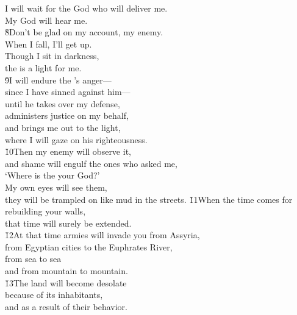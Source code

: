 \begin{poetry}
\poemll    I will wait for the God who will deliver me. \\
\poemlll       My God will hear me. \\
\poeml \v{8}Don't be glad on my account, my enemy. \\
\poemll    When I fall, I'll get up. \\
\poeml Though I sit in darkness, \\
\poemll    the  is a light for me. \\
\poeml \v{9}I will endure the 's anger--- \\
\poemll    since I have sinned against him--- \\
\poeml until he takes over my defense, \\
\poemll    administers justice on my behalf, \\
\poeml and brings me out to the light, \\
\poemll    where I will gaze on his righteousness. \\
\poeml \v{10}Then my enemy will observe it, \\
\poemll    and shame will engulf the ones who asked me, \\
\poemlll       `Where is the  your God?' \\
\poeml My own eyes will see them, \\
\poemll    they will be trampled on like mud in the streets.
\poeml \v{11}When the time comes for rebuilding your walls, \\
\poemll    that time will surely be extended. \\
\poeml \v{12}At that time armies will invade you from Assyria, \\
\poemll    from Egyptian cities to the Euphrates River, \\
\poeml from sea to sea \\
\poemll    and from mountain to mountain. \\
\poeml \v{13}The land will become desolate \\
\poemll    because of its inhabitants, \\
\poemlll       and as a result of their behavior. \\

\end{poetry}
